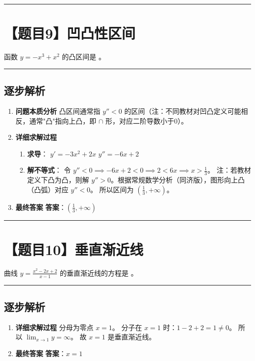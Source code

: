 \documentclass[UTF8]{ctexart}
\newenvironment{redenv}{\color{red}}{}
\newenvironment{detailedanalysis}{%
    \color{red}
    \begin{enumerate}[label=\textbf{第\arabic*步：}, leftmargin=*, align=left, itemsep=1.5ex]
}{%
    \end{enumerate}
}
\newcommand{\problemrule}{\noindent\rule{\textwidth}{1.5pt}\vspace{-0.8em}}
\newcommand{\analysisrule}{\noindent\rule{\textwidth}{0.8pt}\vspace{-0.8em}}
\newcommand{\blank}[1]{\underline{\hspace{#1}}}
\begin{document}
\problemrule
\section*{【题目9】凹凸性区间}
函数 $ y=-x^{3}+x^{2} $ 的凸区间是 \blank{2cm}。

\begin{redenv}
\analysisrule
\subsection*{逐步解析}

\begin{detailedanalysis}
\item \textbf{问题本质分析}
凸区间通常指 $y'' < 0$ 的区间（注：不同教材对凹凸定义可能相反，通常"凸"指向上凸，即 $\cap$ 形，对应二阶导数小于0）。
\item \textbf{详细求解过程}
\begin{enumerate}[label=(\arabic*)]
\item \textbf{求导}：
$y' = -3x^2 + 2x$
$y'' = -6x + 2$
\item \textbf{解不等式}：
令 $y'' < 0 \implies -6x + 2 < 0 \implies 2 < 6x \implies x > \frac{1}{3}$。
注：若教材定义下凸为凸，则解 $y'' > 0$。根据常规数学分析（同济版），图形向上凸（凸弧）对应 $y'' < 0$。
所以区间为 $(\frac{1}{3}, +\infty)$。
\end{enumerate}

\item \textbf{最终答案}
\textbf{答案}：$ (\frac{1}{3}, +\infty) $
\end{detailedanalysis}
\end{redenv}

\problemrule
\section*{【题目10】垂直渐近线}
曲线 $ y = \frac{x^{2}-2x+2}{x-1} $ 的垂直渐近线的方程是 \blank{2cm}。

\begin{redenv}
\analysisrule
\subsection*{逐步解析}

\begin{detailedanalysis}
\item \textbf{详细求解过程}
分母为零点 $x=1$。
分子在 $x=1$ 时：$1 - 2 + 2 = 1 \neq 0$。
所以 $\lim_{x \to 1} y = \infty$。
故 $x=1$ 是垂直渐近线。

\item \textbf{最终答案}
\textbf{答案}：$ x=1 $
\end{detailedanalysis}
\end{redenv}
\end{document}
